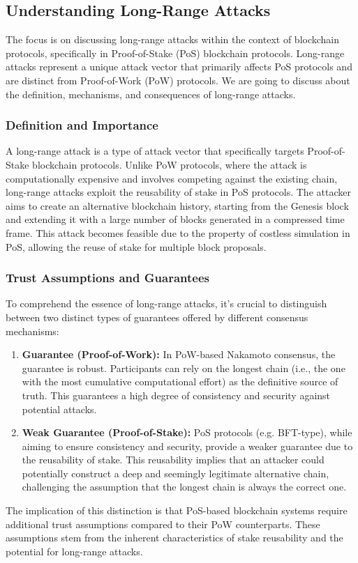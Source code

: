 \subsection{Understanding Long-Range Attacks}
The focus is on discussing long-range attacks within the context of blockchain protocols, specifically in Proof-of-Stake (PoS) blockchain protocols. Long-range attacks represent a unique attack vector that primarily affects PoS protocols and are distinct from Proof-of-Work (PoW) protocols. We are going to discuss about the definition, mechanisms, and consequences of long-range attacks.

\subsubsection{Definition and Importance}
A long-range attack is a type of attack vector that specifically targets Proof-of-Stake blockchain protocols. Unlike PoW protocols, where the attack is computationally expensive and involves competing against the existing chain, long-range attacks exploit the reusability of stake in PoS protocols. The attacker aims to create an alternative blockchain history, starting from the Genesis block and extending it with a large number of blocks generated in a compressed time frame. This attack becomes feasible due to the property of costless simulation in PoS, allowing the reuse of stake for multiple block proposals.
\subsubsection{Trust Assumptions and Guarantees}
To comprehend the essence of long-range attacks, it's crucial to distinguish between two distinct types of guarantees offered by different consensus mechanisms:

\begin{enumerate}[label=\alph*)]
    \item \textbf{Guarantee (Proof-of-Work):} In PoW-based Nakamoto consensus, the guarantee is robust. Participants can rely on the longest chain (i.e., the one with the most cumulative computational effort) as the definitive source of truth. This guarantees a high degree of consistency and security against potential attacks.
    
    \item \textbf{Weak Guarantee (Proof-of-Stake):} PoS protocols (e.g. BFT-type), while aiming to ensure consistency and security, provide a weaker guarantee due to the reusability of stake. This reusability implies that an attacker could potentially construct a deep and seemingly legitimate alternative chain, challenging the assumption that the longest chain is always the correct one.
\end{enumerate}
The implication of this distinction is that PoS-based blockchain systems require additional trust assumptions compared to their PoW counterparts. These assumptions stem from the inherent characteristics of stake reusability and the potential for long-range attacks.

